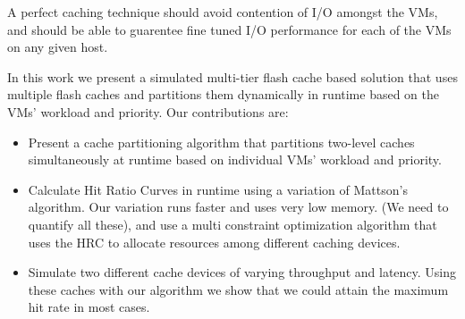 A perfect caching technique should avoid contention of I/O amongst the VMs, and should be able to guarentee fine tuned I/O performance for each of the VMs on any given host.

In this work we present a simulated multi-tier flash cache based solution that uses multiple flash caches and partitions them dynamically in runtime based on the VMs' workload and priority. Our contributions are:
\begin{itemize}
\item Present a cache partitioning algorithm that partitions two-level caches simultaneously at runtime based on individual VMs' workload and priority.
\item Calculate Hit Ratio Curves in runtime using a variation of Mattson's algorithm. Our variation runs faster and uses very low memory. (We need to quantify all these), and use a multi constraint optimization algorithm that uses the HRC to allocate resources among different caching devices.
\item Simulate two different cache devices of varying throughput and latency. Using these caches with our algorithm we show that we could attain the maximum hit rate in most cases.
\end{itemize}

